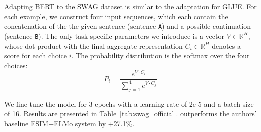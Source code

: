 Adapting BERT to the SWAG dataset is similar to the adaptation for GLUE. For each example, we construct four input sequences, which each contain the concatenation of the the given sentence (sentence {\tt A}) and a possible continuation (sentence {\tt B}). The only task-specific parameters we introduce is a vector $V \in \mathbb{R}^H$, whose dot product with the final aggregate representation $C_i \in \mathbb{R}^H$ denotes a score for each choice $i$. The probability distribution is the softmax over the four choices:
\[P_i = \frac{e^{V{\cdot}C_i}}{\sum_{j=1}^4 e^{ V{\cdot}C_j}}\]

We fine-tune the model for 3 epochs with a learning rate of 2e-5 and a batch size of 16. Results are presented in Table~\ref{tab:swag_official}. \bertlarge outperforms the authors' baseline ESIM+ELMo system by +27.1\%.


